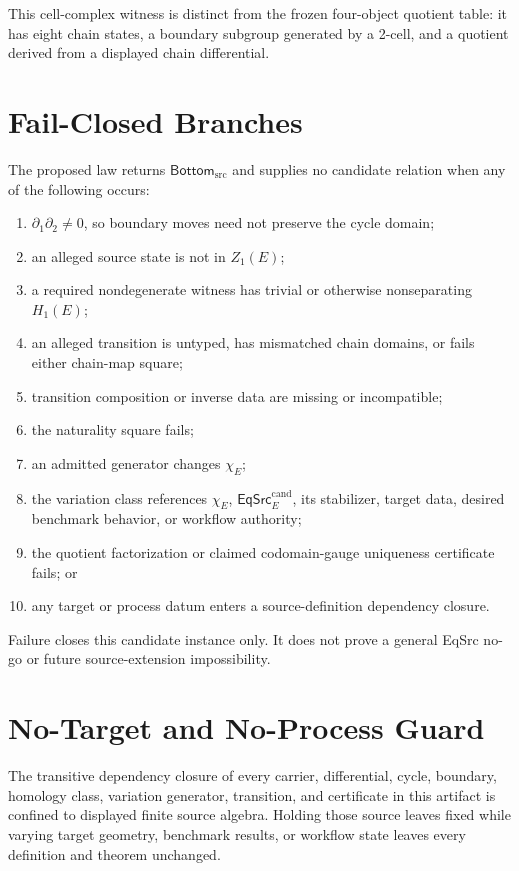 \documentclass[11pt]{article}
\newcommand{\EqCand}{\mathsf{EqSrc}^{\mathrm{cand}}}
\newcommand{\Bottom}{\mathsf{Bottom}_{\mathrm{src}}}
\begin{document}
This cell-complex witness is distinct from the frozen four-object quotient
table: it has eight chain states, a boundary subgroup generated by a
2-cell, and a quotient derived from a displayed chain differential.

\section{Fail-Closed Branches}

The proposed law returns \(\Bottom\) and supplies no candidate relation when
any of the following occurs:
\begin{enumerate}[leftmargin=*]
  \item \(\partial_1\partial_2\neq0\), so boundary moves need not preserve
  the cycle domain;
  \item an alleged source state is not in \(Z_1(E)\);
  \item a required nondegenerate witness has trivial or otherwise
  nonseparating \(H_1(E)\);
  \item an alleged transition is untyped, has mismatched chain domains, or
  fails either chain-map square;
  \item transition composition or inverse data are missing or incompatible;
  \item the naturality square fails;
  \item an admitted generator changes \(\chi_E\);
  \item the variation class references \(\chi_E\), \(\EqCand_E\), its
  stabilizer, target data, desired benchmark behavior, or workflow authority;
  \item the quotient factorization or claimed codomain-gauge uniqueness
  certificate fails; or
  \item any target or process datum enters a source-definition dependency
  closure.
\end{enumerate}
Failure closes this candidate instance only. It does not prove a general
EqSrc no-go or future source-extension impossibility.

\section{No-Target and No-Process Guard}

The transitive dependency closure of every carrier, differential, cycle,
boundary, homology class, variation generator, transition, and certificate in
this artifact is confined to displayed finite source algebra. Holding those
source leaves fixed while varying target geometry, benchmark results, or
workflow state leaves every definition and theorem unchanged.
\end{document}

